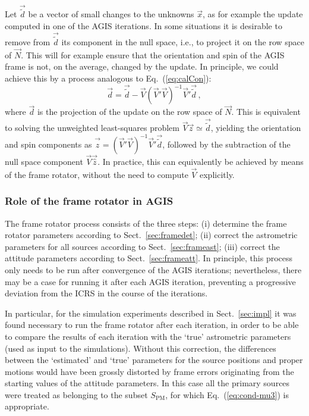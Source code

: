 \documentclass[structabstract]{aa}
\begin{document}
Let $\vec{\tilde{d}}$ be a vector of small changes to the unknowns $\vec{x}$,
as for example the update computed in one of the AGIS iterations. In some
situations it is desirable to remove from $\vec{\tilde{d}}$ its component in
the null space, i.e., to project it on the row space of $\vec{N}$. This will for
example ensure that the orientation and spin of the AGIS frame is not, on
the average, changed by the update. In principle, we could achieve this by a process 
analogous to Eq.~(\ref{eq:calCon}):
\begin{equation} \label{eq:derotate}
\vec{d} = \vec{\tilde{d}} - \vec{V}(\vec{V}'\vec{V})^{-1}\vec{V}'\vec{\tilde{d}} \, ,
\end{equation}
where $\vec{d}$ is the projection of the update on the row space of $\vec{N}$.
This is equivalent to solving the unweighted least-squares problem
$\vec{V}\vec{z}\simeq\vec{\tilde{d}}$, yielding the orientation and spin 
components as $\vec{\hat{z}}=(\vec{V}'\vec{V})^{-1}\vec{V}'\vec{\tilde{d}}$, 
followed by the subtraction of the null space component $\vec{V}\vec{\hat{z}}$.
In practice, this can equivalently be achieved by means of the frame 
rotator, without the need to compute $\vec{V}$ explicitly.

\subsubsection{Role of the frame rotator in AGIS}\label{sec:frole}
The frame rotator process consists of the three steps: (i) determine the
frame rotator parameters according to Sect.~\ref{sec:framedet}; 
(ii) correct the astrometric parameters for all sources according to
Sect.~\ref{sec:frameast}; (iii) correct the attitude parameters
according to Sect.~\ref{sec:frameatt}. In principle, this process only
needs to be run after convergence of the AGIS iterations; nevertheless,
there may be a case for running it after each AGIS iteration, preventing
a progressive deviation from the ICRS in the course of the iterations.

In particular, for the simulation experiments described in Sect.~\ref{sec:impl} 
it was found necessary to run the frame rotator after each iteration, in 
order to be able to compare the results of each iteration with the `true' 
astrometric parameters (used as input to the simulations). Without this
correction, the differences between the `estimated' and `true' parameters 
for the source positions and proper motions would have been grossly 
distorted by frame errors originating from the starting values of the 
attitude parameters. 
In this case all the primary sources were treated as belonging to the 
subset $S_\text{PM}$, for which Eq.~(\ref{eq:cond-mu3}) is appropriate.
\end{document}
